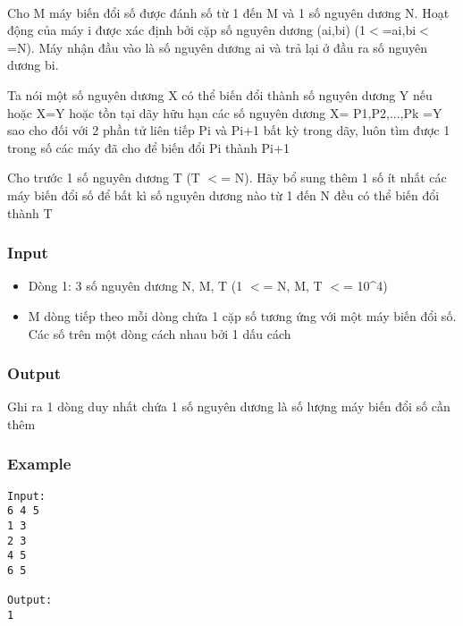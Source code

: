 

 

Cho M máy biến đổi số được đánh số từ 1 đến M và 1 số nguyên dương N. Hoạt động của máy i được xác định bởi cặp số nguyên dương (ai,bi) (1$<$=ai,bi$<$=N). Máy nhận đầu vào là số nguyên dương ai và trả lại ở đầu ra số nguyên dương bi.

Ta nói một số nguyên dương X có thể biến đổi thành số nguyên dương Y nếu hoặc X=Y hoặc tồn tại dãy hữu hạn các số nguyên dương X= P1,P2,...,Pk =Y sao cho đối với 2 phần tử liên tiếp Pi và Pi+1 bất kỳ trong dãy, luôn tìm được 1 trong số các máy đã cho để biến đổi Pi thành Pi+1

Cho trước 1 số nguyên dương T (T $<$= N). Hãy bổ sung thêm 1 số ít nhất các máy biến đổi số để bất kì số nguyên dương nào từ 1 đến N đều có thể biến đổi thành T

\subsubsection{Input}
\begin{itemize}
	\item Dòng 1: 3 số nguyên dương N, M, T (1 $<$= N, M, T $<$= 10\textasciicircum4)
	\item M dòng tiếp theo mỗi dòng chứa 1 cặp số tương ứng với một máy biến đổi số. Các số trên một dòng cách nhau bởi 1 dấu cách
\end{itemize}

\subsubsection{Output}

Ghi ra 1 dòng duy nhất chứa 1 số nguyên dương là số lượng máy biến đổi số cần thêm

\subsubsection{Example}
\begin{verbatim}
Input:
6 4 5
1 3
2 3
4 5
6 5

Output:
1
\end{verbatim}